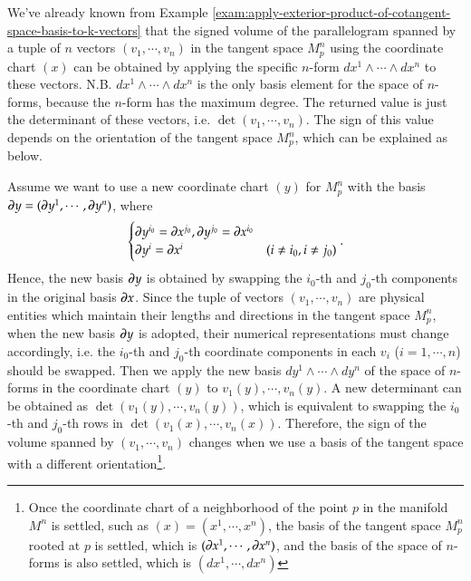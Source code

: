 \documentclass[11pt, a4paper]{book}
\begin{document}
We've already known from Example
\ref{exam:apply-exterior-product-of-cotangent-space-basis-to-k-vectors} that the signed
volume of the parallelogram spanned by a tuple of $n$ vectors $(v_1,\cdots,v_n)$ in the
tangent space $M_{p}^n$ using the coordinate chart $(x)$ can be obtained by applying the
specific $n$-form $dx^1 \wedge \cdots \wedge dx^n$ to these vectors. N.B.
$dx^1 \wedge \cdots \wedge dx^n$ is the only basis element for the space of $n$-forms,
because the $n$-form has the maximum degree. The returned value is just the determinant of
these vectors, i.e. $\det(v_1,\cdots,v_n)$. The sign of this value depends on the
orientation of the tangent space $M_p^n$, which can be explained as below.

Assume we want to use a new coordinate chart $(y)$ for $M_{p}^n$ with the basis
$\boldsymbol{\partial}y = (\boldsymbol{\partial}y^1,\cdots,\boldsymbol{\partial}y^n)$, where
\begin{equation*}
  \begin{cases}
    \boldsymbol{\partial}y^{i_0} = \boldsymbol{\partial}x^{j_0}, \boldsymbol{\partial}y^{j_0} =
    \boldsymbol{\partial}x^{i_0} \\
    \boldsymbol{\partial}y^i = \boldsymbol{\partial}x^i & (i \neq i_0, i\neq j_0)
  \end{cases}.
\end{equation*}
Hence, the new basis $\boldsymbol{\partial}y$ is obtained by swapping the $i_0$-th and $j_0$-th
components in the original basis $\boldsymbol{\partial}x$. Since the tuple of vectors
$(v_1,\cdots,v_n)$ are physical entities which maintain their lengths and directions in
the tangent space $M_p^n$, when the new basis $\boldsymbol{\partial}y$ is adopted, their numerical
representations must change accordingly, i.e. the $i_0$-th and $j_0$-th coordinate
components in each $v_i$ ($i=1,\cdots,n$) should be swapped. Then we apply the new basis
$dy^1 \wedge \cdots \wedge dy^n$ of the space of $n$-forms in the coordinate chart $(y)$
to $v_1(y),\cdots,v_n(y)$. A new determinant can be obtained as
$\det(v_1(y),\cdots,v_n(y))$, which is equivalent to swapping the $i_0$-th and $j_0$-th
rows in $\det(v_1(x),\cdots,v_n(x))$. Therefore, the sign of the volume spanned by
$(v_1,\cdots,v_n)$ changes when we use a basis of the tangent space with a different
orientation\footnote{Once the coordinate chart of a neighborhood of the point $p$ in the
  manifold $M^n$ is settled, such as $(x) = (x^1,\cdots,x^n)$, the basis of the tangent
  space $M_p^n$ rooted at $p$ is settled, which is $(\partial x^1, \cdots, \partial x^n)$, and
  the basis of the space of $n$-forms is also settled, which is $(dx^1, \cdots, dx^n)$}.
\end{document}
